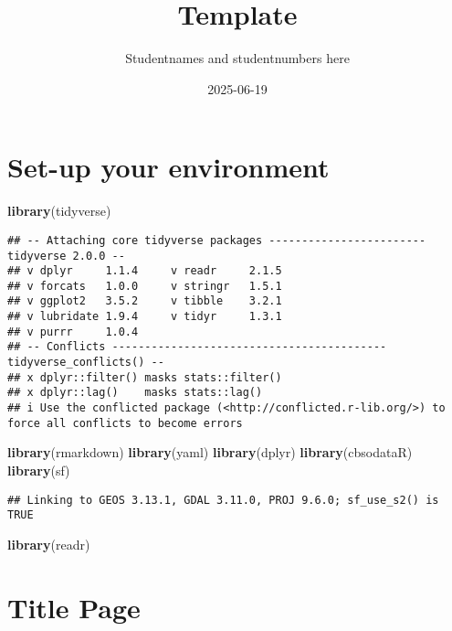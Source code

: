 \documentclass[
]{article}
\title{Template}
\author{Studentnames and studentnumbers here}
\date{2025-06-19}
\newenvironment{Shaded}{\begin{snugshade}}{\end{snugshade}}
\newcommand{\FunctionTok}[1]{\textcolor[rgb]{0.13,0.29,0.53}{\textbf{#1}}}
\newcommand{\NormalTok}[1]{#1}
\begin{document}
\maketitle

\section{Set-up your environment}\label{set-up-your-environment}

\begin{Shaded}
\begin{Highlighting}[]
\FunctionTok{library}\NormalTok{(tidyverse)}
\end{Highlighting}
\end{Shaded}

\begin{verbatim}
## -- Attaching core tidyverse packages ------------------------ tidyverse 2.0.0 --
## v dplyr     1.1.4     v readr     2.1.5
## v forcats   1.0.0     v stringr   1.5.1
## v ggplot2   3.5.2     v tibble    3.2.1
## v lubridate 1.9.4     v tidyr     1.3.1
## v purrr     1.0.4     
## -- Conflicts ------------------------------------------ tidyverse_conflicts() --
## x dplyr::filter() masks stats::filter()
## x dplyr::lag()    masks stats::lag()
## i Use the conflicted package (<http://conflicted.r-lib.org/>) to force all conflicts to become errors
\end{verbatim}

\begin{Shaded}
\begin{Highlighting}[]
\FunctionTok{library}\NormalTok{(rmarkdown)}
\FunctionTok{library}\NormalTok{(yaml)}
\FunctionTok{library}\NormalTok{(dplyr)}
\FunctionTok{library}\NormalTok{(cbsodataR)}
\FunctionTok{library}\NormalTok{(sf)}
\end{Highlighting}
\end{Shaded}

\begin{verbatim}
## Linking to GEOS 3.13.1, GDAL 3.11.0, PROJ 9.6.0; sf_use_s2() is TRUE
\end{verbatim}

\begin{Shaded}
\begin{Highlighting}[]
\FunctionTok{library}\NormalTok{(readr)}
\end{Highlighting}
\end{Shaded}

\section{Title Page}\label{title-page}
\end{document}

